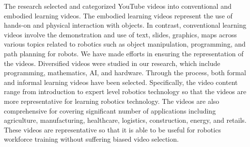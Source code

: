 \documentclass[12pt]{article}
\begin{document}
The research selected and categorized YouTube videos into conventional and embodied learning videos. The embodied learning videos represent the use of hands-on and physical interaction with objects. In contrast, conventional learning videos involve the demonstration and use of text, slides, graphics, maps across various topics related to robotics such as object manipulation, programming, and path planning for robots. We have made efforts in ensuring the representation of the videos. Diversified videos were studied in our research, which include programming, mathematics, AI, and hardware. Through the process, both formal and informal learning videos have been selected. Specifically, the video content range from introduction to expert level robotics technology so that the videos are more representative for learning robotics technology. The videos are also comprehensive for covering significant number of applications including agriculture, manufacturing, healthcare, logistics, construction, energy, and retails. These videos are representative so that it is able to be useful for robotics workforce training without suffering biased video selection. 
\end{document}
